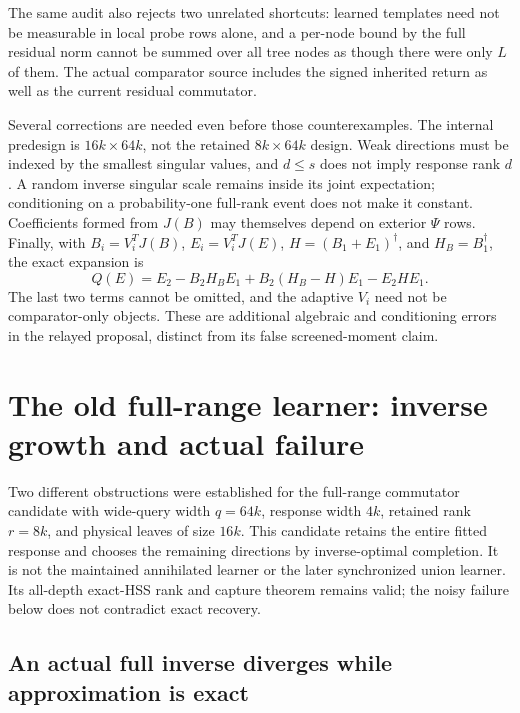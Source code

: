 \documentclass[11pt,oneside,openany,a4paper]{report}
\numberwithin{equation}{chapter}
\theoremstyle{definition}
\theoremstyle{remark}
\begin{document}
The same audit also rejects two unrelated shortcuts: learned templates
need not be measurable in local probe rows alone, and a per-node bound
by the full residual norm cannot be summed over all tree nodes as though
there were only $L$ of them.  The actual comparator source includes the
signed inherited return as well as the current residual commutator.

Several corrections are needed even before those counterexamples.
The internal predesign is $16k\times64k$, not the retained
$8k\times64k$ design.  Weak directions must be indexed by the smallest
singular values, and $d\le s$ does not imply response rank $d$.
A random inverse singular scale remains inside its joint expectation;
conditioning on a probability-one full-rank event does not make it
constant.  Coefficients formed from $J(B)$ may themselves depend on
exterior $\Psi$ rows.  Finally, with
$B_i=V_i^TJ(B)$, $E_i=V_i^TJ(E)$,
$H=(B_1+E_1)^\dagger$, and $H_B=B_1^\dagger$, the exact expansion is
\[
 Q(E)=E_2-B_2H_BE_1+B_2(H_B-H)E_1-E_2HE_1.
\]
The last two terms cannot be omitted, and the adaptive $V_i$ need not
be comparator-only objects.  These are additional algebraic and
conditioning errors in the relayed proposal, distinct from its false
screened-moment claim.

\section{The old full-range learner: inverse growth and actual failure}
\label{sec:later-fullrange}

Two different obstructions were established for the full-range
commutator candidate with wide-query width $q=64k$, response width
$4k$, retained rank $r=8k$, and physical leaves of size $16k$.  This
candidate retains the entire fitted response and chooses the remaining
directions by inverse-optimal completion.  It is not the maintained
annihilated learner or the later synchronized union learner.  Its
all-depth exact-HSS rank and capture theorem remains valid; the noisy
failure below does not contradict exact recovery.

\subsection{An actual full inverse diverges while approximation is exact}
\end{document}
